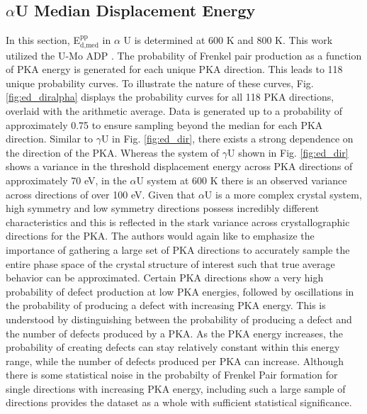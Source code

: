 \documentclass[review]{elsarticle}
\begin{document}
\FloatBarrier

\subsection{$\alpha$U Median Displacement Energy}

In this section, E$^{\textrm{pp}}_{\textrm{d,med}}$ in $\alpha$ U is determined at 600 K and 800 K. This work utilized the U-Mo ADP \cite{smirnovaADP}. The probability of Frenkel pair production as a function of PKA energy is generated for each unique PKA direction. This leads to 118 unique probability curves. To illustrate the nature of these curves, Fig. \ref{fig:ed_diralpha} displays the probability curves for all 118 PKA directions, overlaid with the arithmetic average. Data is generated up to a probability of approximately 0.75 to ensure sampling beyond the median for each PKA direction. Similar to $\gamma$U in Fig. \ref{fig:ed_dir}, there exists a strong dependence on the direction of the PKA. Whereas the system of $\gamma$U shown in Fig. \ref{fig:ed_dir} shows a variance in the threshold displacement energy across PKA directions of approximately 70 eV, in the $\alpha$U system at 600 K there is an observed variance across directions of over 100 eV. Given that $\alpha$U is a more complex crystal system, high symmetry and low symmetry directions possess incredibly different characteristics and this is reflected in the stark variance across crystallographic directions for the PKA. The authors would again like to emphasize the importance of gathering a large set of PKA directions to accurately sample the entire phase space of the crystal structure of interest such that true average behavior can be approximated. Certain PKA directions show a very high probability of defect production at low PKA energies, followed by oscillations in the probability of producing a defect with increasing PKA energy. This is understood by distinguishing between the probability of producing a defect and the number of defects produced by a PKA. As the PKA energy increases, the probability of creating defects can stay relatively constant within this energy range, while the number of defects produced per PKA can increase. Although there is some statistical noise in the probabilty of Frenkel Pair formation for single directions with increasing PKA energy, including such a large sample of directions provides the dataset as a whole with sufficient statistical significance. 
\end{document}
